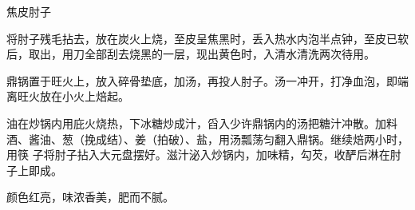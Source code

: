 \begin{recipe}{焦皮肘子}

\ingredients


\preparation

\step 将肘子残毛拈去，放在炭火上烧，至皮呈焦黑时，丢入热水内泡半点钟，至皮已软
后，取出，用刀全部刮去烧黑的一层，现出黄色时，入清水清洗两次待用。

\step 鼎锅置于旺火上，放入碎骨垫底，加汤，再投人肘子。汤一冲开，打净血泡，即端
离旺火放在小火上焙起。

\step 油在炒锅内用庇火烧热，下冰糖炒成汁，舀入少许鼎锅内的汤把糖汁冲散。加料
酒、酱油、葱（挽成结）、姜（拍破）、盐，用汤瓢荡匀翻入鼎锅。继续焙两小时，用筷
子将肘子拈入大元盘摆好。滋汁泌入炒锅内，加味精，勾芡，收酽后淋在肘子上即成。

\features

颜色红亮，味浓香美，肥而不腻。

\end{recipe}

